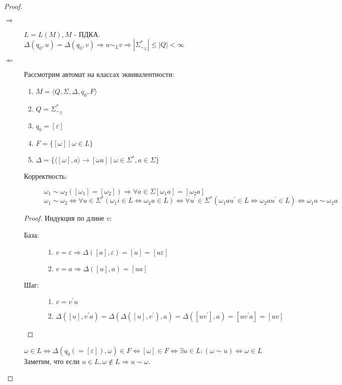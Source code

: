 \documentclass[11pt,a4paper]{article}
\theoremstyle{definition}
\theoremstyle{definition}
\theoremstyle{definition}
\begin{document}
\begin{proof}
\begin{description}
\item[$\Rightarrow$]{$L = L(M), M$ - ПДКА.
$
\Delta(q_0, u) = \Delta(q_0, v) \Rightarrow u\sim_L v \Rightarrow \left|\Sigma^*_{\sim_L}\right| \leq \left|Q\right|<\infty
$}
\item[$\Leftarrow$]{Рассмотрим автомат на классах эквивалентности:
\begin{enumerate}[1)]
\item{$M = \langle Q, \Sigma, \Delta, q_0, F\rangle$}
\item{$Q = \Sigma^*_{\sim_L}$}
\item{$q_0 = [\varepsilon]$}
\item{$F = \{[\omega]~|~\omega\in L\}$}
\item{$\Delta = \{\langle [\omega], a\rangle\rightarrow[\omega a]~|~\omega\in\Sigma^*, a\in \Sigma\}$}
\end{enumerate}
\begin{description}
\item[Корректность:]{$\omega_1\sim\omega_2 ([\omega_1]=[\omega_2])\Rightarrow \forall a\in\Sigma [\omega_1 a]=[\omega_2 a]$
\[
\omega_1\sim\omega_2\Leftrightarrow\forall u\in\Sigma^* (\omega_1 i\in L \Leftrightarrow\omega_2 u\in L)\Leftrightarrow \forall u^\prime\in\Sigma^* (\omega_1 a  u^\prime\in L \Leftrightarrow \omega_2 a u^\prime\in L)\Leftrightarrow \omega_1 a \sim\omega_2 a
\]}
\end{description}
\begin{proof}
Индукция по длине $v$:
\begin{description}
\item[База:]{
\begin{enumerate}
\item{$v=\varepsilon\Rightarrow \Delta([a],\varepsilon) = [u]=[u\varepsilon]$}
\item{$v = a\Rightarrow\Delta([u], a) = [ua]$}
\end{enumerate}}
\item[Шаг:]{
\begin{enumerate}[1)]
\item{$v = v^\prime u$}
\item{$\Delta([u], v^\prime a) = \Delta(\Delta([u],v^\prime), a) = \Delta([uv^\prime], a)=[uv^\prime a]=[uv]$}
\end{enumerate}}
\end{description}
\end{proof}}
\[\omega\in L \Leftrightarrow\Delta(q_0 (=[\varepsilon]),\omega)\in F \Leftrightarrow[\omega]\in F \Leftrightarrow\exists u\in L: (\omega\sim u) \Leftrightarrow\omega\in L\]
Заметим, что если $u\in L, \omega \notin L\Rightarrow u\sim \omega.$

\end{description}
\end{proof}
\end{document}
